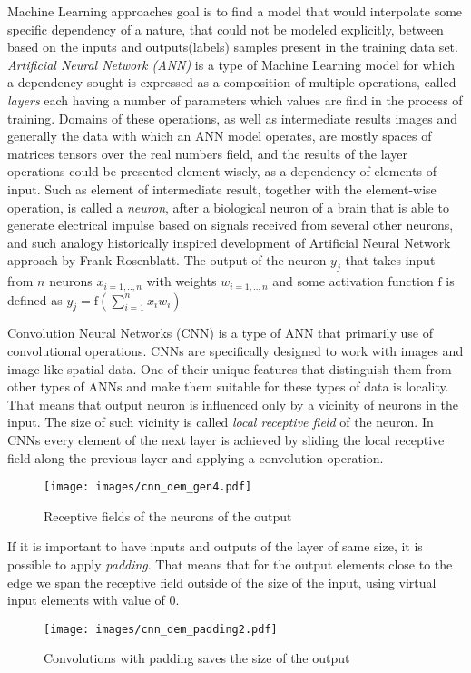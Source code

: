 Machine Learning approaches goal is to find a model that would interpolate some specific dependency of a nature, that could not be modeled explicitly, between based on the inputs and outputs(labels) samples present in the training data set.
\emph{Artificial Neural Network (ANN)} is a type of Machine Learning model for which a dependency sought is expressed as a composition of multiple operations, called \emph{layers} each having a number of parameters which values are find in the process of training.
Domains of these operations, as well as intermediate results images and generally the data with which an ANN model operates, are mostly spaces of matrices tensors over the real numbers field, and the results of the layer operations could be presented element-wisely, as a dependency of elements of input.
Such as element of intermediate result, together with the element-wise operation, is called a \emph{neuron}, after a biological neuron of a brain that is able to generate electrical impulse based on signals received from several other neurons, and such analogy historically inspired development of Artificial Neural Network approach by Frank Rosenblatt\cite{}.
The output of the neuron $y_{j}$ that takes input from $n$ neurons $x_{i=1,..,n}$ with weights $w_{i=1,..,n}$ and some activation function $\mathrm{f}$ is defined as $ y_{j}=\mathrm{f}(\sum_{i=1}^{n} x_{i}w_{i})$
\medskip
{}

Convolution Neural Networks (CNN) is a type of ANN that primarily use of convolutional operations.
CNNs are specifically designed to work with images and image-like spatial data.
One of their unique features that distinguish them from other types of ANNs and make them suitable for these types of data is locality.
That means that output neuron is influenced only by a vicinity of neurons in the input.
The size of such vicinity is called \emph{local receptive field} of the neuron.
In CNNs every element of the next layer is achieved by sliding the local receptive field along the previous layer and applying a convolution operation.
\begin{figure}
	\centering
	\texttt{[image: images/cnn\_dem\_gen4.pdf]}
	\caption{Receptive fields of the neurons of the output}
	\label{fig:rec_field_demo}
\end{figure}

If it is important to have inputs and outputs of the layer of same size, it is possible to apply \emph{padding}.
That means that for the output elements close to the edge we span the receptive field outside of the size of the input, using virtual input elements with value of $0$. 
\begin{figure}
	\centering
	\texttt{[image: images/cnn\_dem\_padding2.pdf]}
	\caption{Convolutions with padding saves the size of the output}
	\label{fig:padding_demo}
\end{figure}
\medskip

